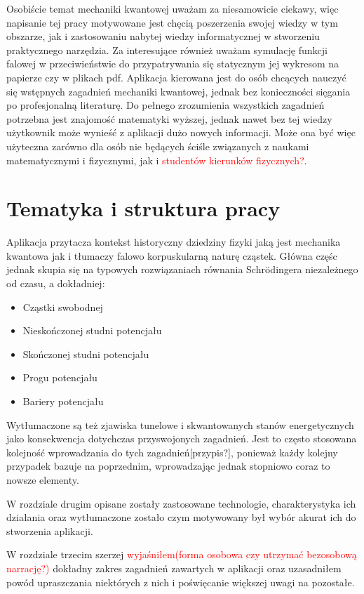 \documentclass{SGGW-thesis}
\begin{document}
	Osobiście temat mechaniki kwantowej uważam za niesamowicie ciekawy, więc napisanie tej pracy motywowane jest chęcią poszerzenia swojej wiedzy w tym obszarze, jak i zastosowaniu nabytej wiedzy informatycznej w stworzeniu praktycznego narzędzia. Za interesujące również uważam symulację funkcji falowej w przeciwieństwie do przypatrywania się statycznym jej wykresom na papierze czy w plikach pdf. Aplikacja kierowana jest do osób chcących nauczyć się wstępnych zagadnień mechaniki kwantowej, jednak bez konieczności sięgania po profesjonalną literaturę. Do pełnego zrozumienia wszystkich zagadnień potrzebna jest znajomość matematyki wyższej, jednak nawet bez tej wiedzy użytkownik może wynieść z aplikacji dużo nowych informacji. Może ona być więc użyteczna zarówno dla osób nie będących ściśle związanych z naukami matematycznymi i fizycznymi, jak i \textcolor{red}{studentów kierunków fizycznych?}.
	\section{Tematyka i struktura pracy}
	Aplikacja przytacza kontekst historyczny dziedziny fizyki jaką jest mechanika kwantowa jak i tłumaczy falowo korpuskularną naturę cząstek. Główna częśc jednak skupia się na typowych rozwiązaniach równania Schrödingera niezależnego od czasu, a dokładniej:
	\begin{itemize}
	\item Cząstki swobodnej
	\item Nieskończonej studni potencjału
	\item Skończonej studni potencjału
	\item Progu potencjału
	\item Bariery potencjału
	\end{itemize}
	
	Wytłumaczone są też zjawiska tunelowe i skwantowanych stanów energetycznych jako konsekwencja dotychczas przyswojonych zagadnień. Jest to często stosowana kolejność wprowadzania do tych zagadnień[przypis?], ponieważ każdy kolejny przypadek bazuje na poprzednim, wprowadzając jednak stopniowo coraz to nowsze elementy.
	
	W rozdziale drugim opisane zostały zastosowane technologie, charakterystyka ich działania oraz wytłumaczone zostało czym motywowany był wybór akurat ich do stworzenia aplikacji.
	
	W rozdziale trzecim szerzej \textcolor{red}{wyjaśniłem(forma osobowa czy utrzymać bezosobową narrację?)} dokładny zakres zagadnień zawartych w aplikacji oraz uzasadniłem powód upraszczania niektórych z nich i poświęcanie większej uwagi na pozostałe.
	
\end{document}

